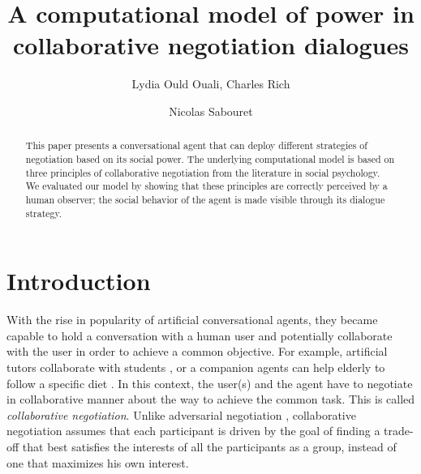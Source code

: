 \documentclass{llncs}
\begin{document}
	\title{\vskip -10pt A computational model of power in collaborative negotiation dialogues}
	
	\author{Lydia Ould Ouali, Charles Rich \and
		Nicolas Sabouret }
	

	\maketitle
	
	\begin{abstract}
		This paper presents a conversational agent that can deploy different strategies of negotiation based on its social power. The underlying computational model is based on three principles of collaborative negotiation from the literature in social psychology. We evaluated our model by showing that these principles are correctly perceived by a human observer; the social behavior of the agent is made visible through its dialogue strategy.
	\end{abstract}
	
	\section{Introduction}
	With the rise in popularity of artificial conversational agents, they became capable to hold a conversation with a human user and potentially collaborate with the user in order to achieve a common objective. For example, artificial tutors collaborate with students \cite{gulz2011extending}, or a companion agents can help elderly to follow a specific diet \cite{kidd2005sociable}. In this context, the user(s) and the agent have to negotiate in collaborative manner about the way to achieve the common task. This is called \emph{collaborative negotiation}. Unlike adversarial negotiation \cite{traum2008multi}, collaborative negotiation assumes that each participant is driven by the goal of finding a trade-off that best satisfies the interests of all the participants as a group, instead of one that maximizes his own interest\cite{sidnerartificial,chu1995response}.
	
\end{document}
